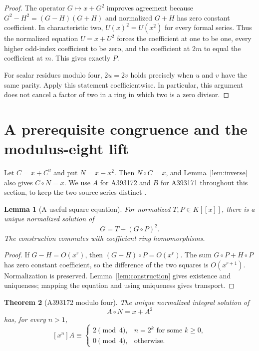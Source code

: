 \documentclass[11pt,a4paper]{article}
\newtheorem{theorem}{Theorem}[section]
\newtheorem{lemma}[theorem]{Lemma}
\theoremstyle{remark}
\begin{document}
\begin{proof}
The operator $G\mapsto x+G^2$ improves agreement because
$G^2-H^2=(G-H)(G+H)$ and normalized $G+H$ has zero constant coefficient.
In characteristic two, $U(x)^2=U(x^2)$ for every formal series. Thus the
normalized equation $U=x+U^2$ forces the coefficient at one to be one,
every higher odd-index coefficient to be zero, and the coefficient at
$2m$ to equal the coefficient at $m$. This gives exactly $P$.

For scalar residues modulo four, $2u=2v$ holds precisely when $u$ and $v$
have the same parity. Apply this statement coefficientwise. In
particular, this argument does not cancel a factor of two in a ring in
which two is a zero divisor.
\end{proof}

\section{A prerequisite congruence and the modulus-eight lift}

Let $C=x+C^2$ and put $N=x-x^2$. Then $N\circ C=x$, and
Lemma~\ref{lem:inverse} also gives $C\circ N=x$. We use $A$ for A393172
and $B$ for A393171 throughout this section, to keep the two source
series distinct \cite{oeis172,oeis171}.

\begin{lemma}[A useful square equation]\label{lem:square}
For normalized $T,P\in K[[x]]$, there is a unique normalized solution of
\[
 G=T+(G\circ P)^2.
\]
The construction commutes with coefficient ring homomorphisms.
\end{lemma}

\begin{proof}
If $G-H=O(x^r)$, then $(G-H)\circ P=O(x^r)$. The sum
$G\circ P+H\circ P$ has zero constant coefficient, so the difference
of the two squares is $O(x^{r+1})$. Normalization is preserved.
Lemma~\ref{lem:construction} gives existence and uniqueness; mapping the
equation and using uniqueness gives transport.
\end{proof}

\begin{theorem}[A393172 modulo four]\label{thm:catalanfour}
The unique normalized integral solution of
\[
 A\circ N=x+A^2 \tag{1}
\]
has, for every $n>1$,
\[
 [x^n]A\equiv
 \begin{cases}
 2\pmod4,& n=2^k\text{ for some }k\ge0,\\
 0\pmod4,& \text{otherwise}.
 \end{cases}
\]
\end{theorem}
\end{document}
